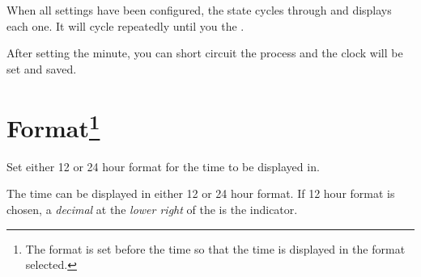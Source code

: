 \tabcolsep=8pt
\tabcolsep=12pt

When all settings have been configured, the  state cycles through and
displays each one.  It will cycle repeatedly until you  the .

\par\medskip

After setting the minute, you can short circuit the process and the clock
will be set and saved.

\tabcolsep=7pt
\tabcolsep=12pt

\section[Format]{Format\footnote{ The format is set before
  the time so that the time is displayed in the format selected.}} 

Set either \num{12} or \num{24} hour format for the time to be displayed in.


The time can be displayed in either \num{12} or \num{24} hour format. If
\num{12} hour format is chosen, a \textit{decimal} at the \textit{lower right}
of the  is the  indicator.


